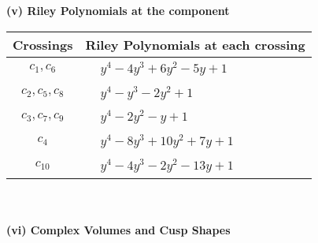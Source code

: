 \documentclass[1p]{elsarticle_modified}
\theoremstyle{definition}
\begin{document}
\newpage\renewcommand{\arraystretch}{1}
\flushleft \textbf{(v) Riley Polynomials at the component}\newline \\
\begin{tabular}{m{50pt}|m{274pt}}
Crossings & \hspace{64pt}Riley Polynomials at each crossing \\
\hline $$\begin{aligned}c_{1},c_{6}\end{aligned}$$&$\begin{aligned}
&y^4-4 y^3+6 y^2-5 y+1
\end{aligned}$\\
\hline $$\begin{aligned}c_{2},c_{5},c_{8}\end{aligned}$$&$\begin{aligned}
&y^4- y^3-2 y^2+1
\end{aligned}$\\
\hline $$\begin{aligned}c_{3},c_{7},c_{9}\end{aligned}$$&$\begin{aligned}
&y^4-2 y^2- y+1
\end{aligned}$\\
\hline $$\begin{aligned}c_{4}\end{aligned}$$&$\begin{aligned}
&y^4-8 y^3+10 y^2+7 y+1
\end{aligned}$\\
\hline $$\begin{aligned}c_{10}\end{aligned}$$&$\begin{aligned}
&y^4-4 y^3-2 y^2-13 y+1
\end{aligned}$\\
\hline
\end{tabular}\\~\\
\newpage\flushleft \textbf{(vi) Complex Volumes and Cusp Shapes}
\end{document}
